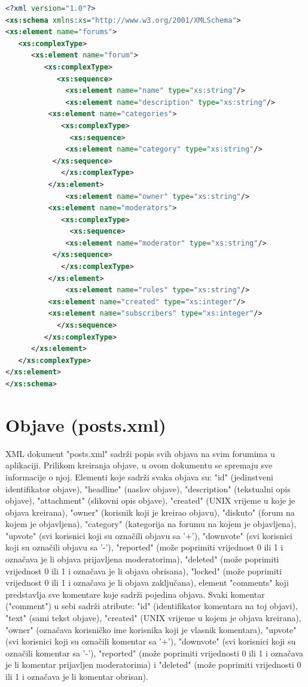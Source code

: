 \documentclass{foi}
\begin{document}
\begin{lstlisting}[language=XML]
 <?xml version="1.0"?>
<xs:schema xmlns:xs="http://www.w3.org/2001/XMLSchema">
<xs:element name="forums">
   <xs:complexType>
      <xs:element name="forum">
         <xs:complexType>
            <xs:sequence>
              <xs:element name="name" type="xs:string"/>
              <xs:element name="description" type="xs:string"/>
	      <xs:element name="categories">
	         <xs:complexType>
	           <xs:sequence>
		      <xs:element name="category" type="xs:string"/>
		   </xs:sequence>
	         </xs:complexType>
	      </xs:element>
              <xs:element name="owner" type="xs:string"/>
	      <xs:element name="moderators">
	         <xs:complexType>
	           <xs:sequence>
		      <xs:element name="moderator" type="xs:string"/>
		   </xs:sequence>
	         </xs:complexType>
	      </xs:element>
              <xs:element name="rules" type="xs:string"/>
	      <xs:element name="created" type="xs:integer"/>
	      <xs:element name="subscribers" type="xs:integer"/>
            </xs:sequence>
         </xs:complexType>
      </xs:element>
   </xs:complexType>
</xs:element>
</xs:schema> 
\end{lstlisting}

\section{Objave (posts.xml)}

XML dokument "posts.xml" sadrži popis svih objava na svim forumima u aplikaciji. Prilikom kreiranja objave, u ovom dokumentu se spremaju sve informacije o njoj.  Elementi koje sadrži svaka objava su: "id" (jedinstveni identifikator objave), "headline" (naslov objave), "description" (tekstualni opis objave), "attachment" (slikovni opis objave), "created" (UNIX vrijeme u koje je objava kreirana), "owner" (korisnik koji je kreirao objavu), "diskuto" (forum na kojem je objavljena), "category" (kategorija na forumu na kojem je objavljena), "upvote" (svi korisnici koji su označili objavu sa '+'), "downvote" (svi korisnici koji su označili objavu sa '-'), "reported" (može poprimiti vrijednost 0 ili 1 i označava je li objava prijavljena moderatorima), "deleted" (može poprimiti vrijednost 0 ili 1 i označava je li objava obrisana), "locked" (može poprimiti vrijednost 0 ili 1 i označava je li objava zaključana), element "comments" koji predstavlja sve komentare koje sadrži pojedina objava. Svaki komentar ("comment") u sebi sadrži atribute: "id" (identifikator komentara na toj objavi), "text" (sami tekst objave), "created" (UNIX vrijeme u kojem je objava kreirana), "owner" (označava korisničko ime korisnika koji je vlasnik komentara), "upvote" (svi korisnici koji su označili komentar sa '+'), "downvote" (svi korisnici koji su označili komentar sa '-'), "reported" (može poprimiti vrijednosti 0 ili 1 i označava je li komentar prijavljen moderatorima) i "deleted" (može poprimiti vrijednosti 0 ili 1 i označava je li komentar obrisan).
\end{document}
